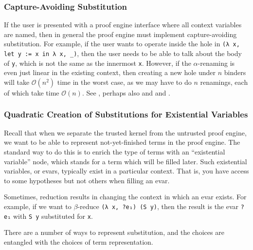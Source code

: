 
\subsubsection{Capture-Avoiding Substitution} \label{sec:perf:capture-avoiding-subst}
If the user is presented with a proof engine interface where all context variables are named, then in general the proof engine must implement capture-avoiding substitution.
For example, if the user wants to operate inside the hole in \texttt{(λ x, let y := x in λ x, _)}, then the user needs to be able to talk about the body of \texttt{y}, which is not the same as the innermost \texttt{x}.
However, if the $\alpha$-renaming is even just linear in the existing context, then creating a new hole under $n$ binders will take $\mathcal{O}(n^2)$ time in the worst case, as we may have to do $n$ renamings, each of which take time $\mathcal O(n)$.
See , perhaps also  and  and .


\subsubsection{Quadratic Creation of Substitutions for Existential Variables} \label{sec:perf:quadratic-evar-subst}
Recall  that when we separate the trusted kernel from the untrusted proof engine, we want to be able to represent not-yet-finished terms in the proof engine.
The standard way to do this is to enrich the type of terms with an ``existential variable'' node, which stands for a term which will be filled later.
Such existential variables, or evars, typically exist in a particular context.
That is, you have access to some hypotheses but not others when filling an evar.

Sometimes, reduction results in changing the context in which an evar exists.
For example, if we want to $\beta$-reduce \texttt{(λ x, ?e₁) (S y)}, then the result is the evar \texttt{?e₁} with \texttt{S y} substituted for \texttt{x}.

There are a number of ways to represent substitution, and the choices are entangled with the choices of term representation.


